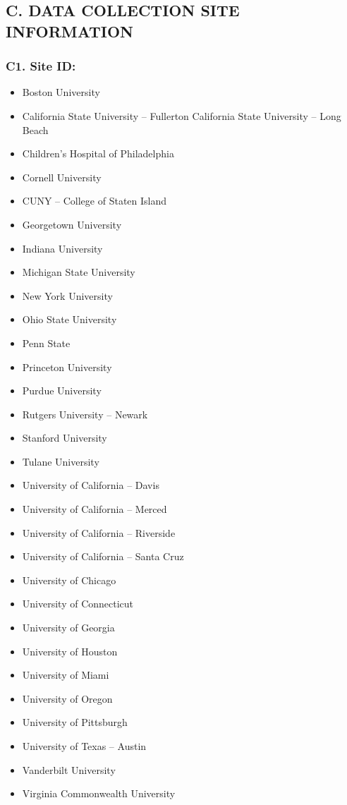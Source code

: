 \documentclass[
  12pt,
]{book}
\providecommand{\tightlist}{%
  \setlength{\itemsep}{0pt}\setlength{\parskip}{0pt}}
\begin{document}
\hypertarget{c.-data-collection-site-information}{%
\subsection*{C. DATA COLLECTION SITE INFORMATION}\label{c.-data-collection-site-information}}

\hypertarget{c1.-site-id}{%
\subsubsection*{C1. Site ID:}\label{c1.-site-id}}

\begin{itemize}
\tightlist
\item
  Boston University
\item
  California State University -- Fullerton California State University -- Long Beach
\item
  Children's Hospital of Philadelphia
\item
  Cornell University
\item
  CUNY -- College of Staten Island
\item
  Georgetown University
\item
  Indiana University
\item
  Michigan State University
\item
  New York University
\item
  Ohio State University
\item
  Penn State
\item
  Princeton University
\item
  Purdue University
\item
  Rutgers University -- Newark
\item
  Stanford University
\item
  Tulane University
\item
  University of California -- Davis
\item
  University of California -- Merced
\item
  University of California -- Riverside
\item
  University of California -- Santa Cruz
\item
  University of Chicago
\item
  University of Connecticut
\item
  University of Georgia
\item
  University of Houston
\item
  University of Miami
\item
  University of Oregon
\item
  University of Pittsburgh
\item
  University of Texas -- Austin
\item
  Vanderbilt University
\item
  Virginia Commonwealth University
\end{itemize}
\end{document}
